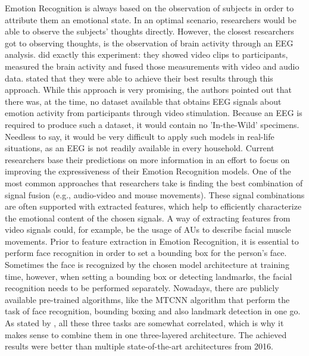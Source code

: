 Emotion Recognition is always based on the observation of subjects in order to attribute them an emotional state. In an optimal scenario, researchers would be able to observe the subjects' thoughts directly. However, the closest researchers got to observing thoughts, is the observation of brain activity through an EEG analysis. \citet{Xing:2019:EEGAudioVisual} did exactly this experiment: they showed video clips to participants, measured the brain activity and fused those measurements with video and audio data. \citet{Xing:2019:EEGAudioVisual} stated that they were able to achieve their best results through this approach.
\newline
While this approach is very promising, the authors pointed out that there was, at the time, no dataset available that obtains EEG signals about emotion activity from participants through video stimulation. Because an EEG is required to produce such a dataset, it would contain no 'In-the-Wild' specimens. Needless to say, it would be very difficult to apply such models in real-life situations, as an EEG is not readily available in every household.
\newline\newline
Current researchers base their predictions on more information in an effort to focus on improving the expressiveness of their Emotion Recognition models. One of the most common approaches that researchers take is finding the best combination of signal fusion (e.g., audio-video and mouse movements). These signal combinations are often supported with extracted features, which help to efficiently characterize the emotional content of the chosen signals. A way of extracting features from video signals could, for example, be the usage of AUs to describe facial muscle movements. 
\newline\newline
Prior to feature extraction in Emotion Recognition, it is essential to perform face recognition in order to set a bounding box for the person's face. Sometimes the face is recognized by the chosen model architecture at training time, however, when setting a bounding box or detecting landmarks, the facial recognition needs to be performed separately. Nowadays, there are publicly available pre-trained algorithms, like the MTCNN algorithm \citep{Zhang:2016:MTCCN} that perform the task of face recognition, bounding boxing and also landmark detection in one go. As stated by \citet{Zhang:2016:MTCCN}, all these three tasks are somewhat correlated, which is why it makes sense to combine them in one three-layered architecture. The achieved results were better than multiple state-of-the-art architectures from 2016.
